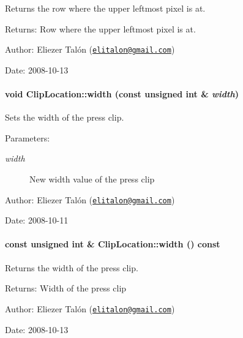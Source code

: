 Returns the row where the upper leftmost pixel is at. 

\begin{Desc}
\item[Returns:]Row where the upper leftmost pixel is at.\end{Desc}
\begin{Desc}
\item[Author:]Eliezer Talón (\href{mailto:elitalon@gmail.com}{\tt elitalon@gmail.com}) \end{Desc}
\begin{Desc}
\item[Date:]2008-10-13 \end{Desc}
\hypertarget{class_clip_location_7dc15a35acc1594dfc1e5f64ca33d3b9}{
\paragraph[{width}]{\setlength{\rightskip}{0pt plus 5cm}void ClipLocation::width (const unsigned int \& {\em width})}\hfill}
\label{class_clip_location_7dc15a35acc1594dfc1e5f64ca33d3b9}


Sets the width of the press clip. 

\begin{Desc}
\item[Parameters:]
\begin{description}
\item[{\em width}]New width value of the press clip\end{description}
\end{Desc}
\begin{Desc}
\item[Author:]Eliezer Talón (\href{mailto:elitalon@gmail.com}{\tt elitalon@gmail.com}) \end{Desc}
\begin{Desc}
\item[Date:]2008-10-11 \end{Desc}
\hypertarget{class_clip_location_e48a4531c0473ec63dbc992e866a50e7}{
\paragraph[{width}]{\setlength{\rightskip}{0pt plus 5cm}const unsigned int \& ClipLocation::width () const}\hfill}
\label{class_clip_location_e48a4531c0473ec63dbc992e866a50e7}


Returns the width of the press clip. 

\begin{Desc}
\item[Returns:]Width of the press clip\end{Desc}
\begin{Desc}
\item[Author:]Eliezer Talón (\href{mailto:elitalon@gmail.com}{\tt elitalon@gmail.com}) \end{Desc}
\begin{Desc}
\item[Date:]2008-10-13 \end{Desc}
